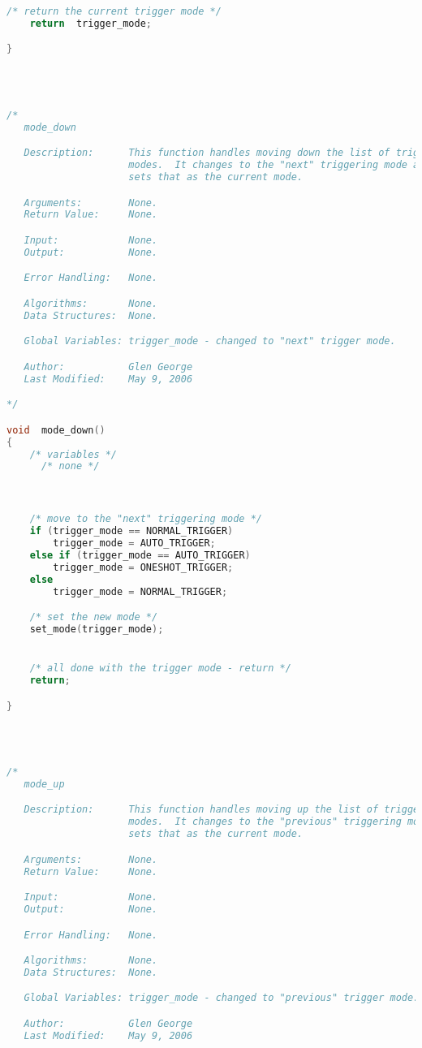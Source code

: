 \begin{lstlisting}[language=C]
    /* return the current trigger mode */
    return  trigger_mode;

}




/*
   mode_down

   Description:      This function handles moving down the list of trigger
                     modes.  It changes to the "next" triggering mode and
                     sets that as the current mode.

   Arguments:        None.
   Return Value:     None.

   Input:            None.
   Output:           None.

   Error Handling:   None.

   Algorithms:       None.
   Data Structures:  None.

   Global Variables: trigger_mode - changed to "next" trigger mode.

   Author:           Glen George
   Last Modified:    May 9, 2006

*/

void  mode_down()
{
    /* variables */
      /* none */



    /* move to the "next" triggering mode */
    if (trigger_mode == NORMAL_TRIGGER)
        trigger_mode = AUTO_TRIGGER;
    else if (trigger_mode == AUTO_TRIGGER)
        trigger_mode = ONESHOT_TRIGGER;
    else
        trigger_mode = NORMAL_TRIGGER;

    /* set the new mode */
    set_mode(trigger_mode);


    /* all done with the trigger mode - return */
    return;

}




/*
   mode_up

   Description:      This function handles moving up the list of trigger
                     modes.  It changes to the "previous" triggering mode and
                     sets that as the current mode.

   Arguments:        None.
   Return Value:     None.

   Input:            None.
   Output:           None.

   Error Handling:   None.

   Algorithms:       None.
   Data Structures:  None.

   Global Variables: trigger_mode - changed to "previous" trigger mode.

   Author:           Glen George
   Last Modified:    May 9, 2006


\end{lstlisting}
